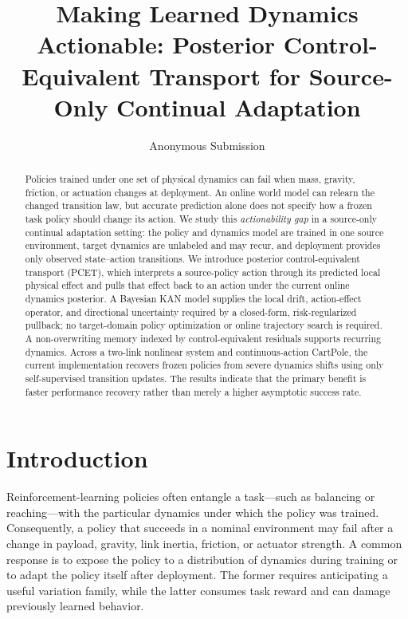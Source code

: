\documentclass[letterpaper]{article}
\title{Making Learned Dynamics Actionable: Posterior Control-Equivalent
Transport for Source-Only Continual Adaptation}
\author{Anonymous Submission}
\begin{document}
\maketitle

\begin{abstract}
Policies trained under one set of physical dynamics can fail when mass,
gravity, friction, or actuation changes at deployment.  An online world model
can relearn the changed transition law, but accurate prediction alone does not
specify how a frozen task policy should change its action.  We study this
\emph{actionability gap} in a source-only continual adaptation setting: the
policy and dynamics model are trained in one source environment, target
dynamics are unlabeled and may recur, and deployment provides only observed
state--action transitions.  We introduce posterior control-equivalent
transport (PCET), which interprets a source-policy action through its predicted
local physical effect and pulls that effect back to an action under the current
online dynamics posterior.  A Bayesian KAN model supplies the local drift,
action-effect operator, and directional uncertainty required by a closed-form,
risk-regularized pullback; no target-domain policy optimization or online
trajectory search is required.  A non-overwriting memory indexed by
control-equivalent residuals supports recurring dynamics.  Across a two-link
nonlinear system and continuous-action CartPole, the current implementation
recovers frozen policies from severe dynamics shifts using only self-supervised
transition updates.  The results indicate that the primary benefit is faster
performance recovery rather than merely a higher asymptotic success rate.
\end{abstract}

\section{Introduction}

Reinforcement-learning policies often entangle a task---such as balancing or
reaching---with the particular dynamics under which the policy was trained.
Consequently, a policy that succeeds in a nominal environment may fail after a
change in payload, gravity, link inertia, friction, or actuator strength.  A
common response is to expose the policy to a distribution of dynamics during
training or to adapt the policy itself after deployment.  The former requires
anticipating a useful variation family, while the latter consumes task reward
and can damage previously learned behavior.
\end{document}
